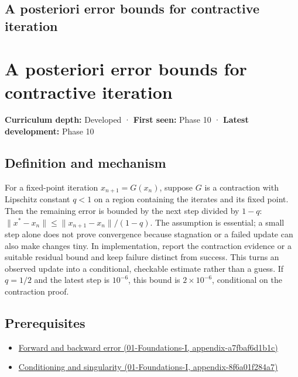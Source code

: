 \hypertarget{appendix-d83b0ad1be7f}{}
\section*{A posteriori error bounds for contractive iteration}
\chapter{A posteriori error bounds for contractive iteration}\label{appendix-d83b0ad1be7f-a-posteriori-error-bounds-for-contractive-iteration}

\textbf{Curriculum depth:} Developed · \textbf{First seen:} Phase 10 · \textbf{Latest development:} Phase 10

\section{Definition and mechanism}\label{appendix-d83b0ad1be7f-definition-and-mechanism}

For a fixed-point iteration \(x_{n+1}=G(x_n)\), suppose \(G\) is a contraction with Lipschitz constant \(q<1\) on a region containing the iterates and its fixed point. Then the remaining error is bounded by the next step divided by \(1-q\): \(\|x^*-x_n\|\le\|x_{n+1}-x_n\|/(1-q)\). The assumption is essential; a small step alone does not prove convergence because stagnation or a failed update can also make changes tiny. In implementation, report the contraction evidence or a suitable residual bound and keep failure distinct from success. This turns an observed update into a conditional, checkable estimate rather than a guess. If \(q=1/2\) and the latest step is \(10^{-6}\), this bound is \(2\times10^{-6}\), conditional on the contraction proof.

\section{Prerequisites}\label{appendix-d83b0ad1be7f-prerequisites}

\begin{itemize}
\tightlist
\item
  \href{../01-Foundations-I/main.pdf\#nameddest=appendix-a7fbaf6d1b1c}{Forward and backward error (01-Foundations-I, appendix-a7fbaf6d1b1c)}
\item
  \href{../01-Foundations-I/main.pdf\#nameddest=appendix-8f6a01f284a7}{Conditioning and singularity (01-Foundations-I, appendix-8f6a01f284a7)}
\end{itemize}

